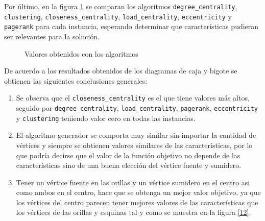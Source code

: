 \documentclass{article}
\begin{document}
Por último, en la figura \ref{11} se comparan los algoritmos \texttt{degree\_centrality}, \texttt{clustering}, \texttt{closeness\_centrality}, \texttt{load\_centrality}, \texttt{eccentricity} y \texttt{pagerank} para cada instancia, esperando determinar que características  pudieran ser relevantes para la solución. 

\begin{figure}[H]
\centering
{}\hspace{5mm}
\vspace{5mm}
\hspace{5mm}
\vspace{5mm}
\caption{Valores obtenidos con los algoritmos} \label{11}
\end{figure}

De acuerdo a los resultados obtenidos de los diagramas de caja y bigote se obtienen las siguientes conclusiones generales: 
\begin{enumerate}
\item Se observa que el \texttt{closeness\_centrality} es el que tiene valores más altos, seguido por \texttt{degree\_centrality}, \texttt{load\_centrality}, \texttt{pagerank}, \texttt{eccentricity} y \texttt{clustering} teniendo valor cero en todas las instancias.

\item El algoritmo generador se comporta muy similar sin importar la cantidad de vértices y siempre se obtienen valores similares de las características, por lo que podría decirse que el valor de la función objetivo no depende de las características sino de una buena elección del vértice fuente y sumidero.

\item Tener un vértice fuente en las orillas y un vértice sumidero en el centro asi como ambos en el centro, hace que se obtenga un mejor valor objetivo, ya que los vértices del centro parecen tener mejores valores de las características que los vértices de las orillas y esquinas tal y como se muestra en la figura \ref{12}. 


 
\end{enumerate}




\end{document}

